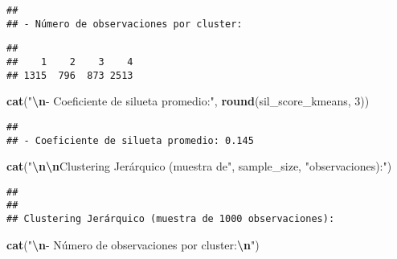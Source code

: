 \documentclass[
]{article}
\newenvironment{Shaded}{\begin{snugshade}}{\end{snugshade}}
\newcommand{\DecValTok}[1]{\textcolor[rgb]{0.00,0.00,0.81}{#1}}
\newcommand{\FunctionTok}[1]{\textcolor[rgb]{0.13,0.29,0.53}{\textbf{#1}}}
\newcommand{\NormalTok}[1]{#1}
\newcommand{\SpecialCharTok}[1]{\textcolor[rgb]{0.81,0.36,0.00}{\textbf{#1}}}
\newcommand{\StringTok}[1]{\textcolor[rgb]{0.31,0.60,0.02}{#1}}
\begin{document}
\begin{verbatim}
## 
## - Número de observaciones por cluster:
\end{verbatim}

\begin{Shaded}
\end{Shaded}

\begin{verbatim}
## 
##    1    2    3    4 
## 1315  796  873 2513
\end{verbatim}

\begin{Shaded}
\begin{Highlighting}[]
\FunctionTok{cat}\NormalTok{(}\StringTok{"}\SpecialCharTok{\textbackslash{}n}\StringTok{{-} Coeficiente de silueta promedio:"}\NormalTok{, }\FunctionTok{round}\NormalTok{(sil\_score\_kmeans, }\DecValTok{3}\NormalTok{))}
\end{Highlighting}
\end{Shaded}

\begin{verbatim}
## 
## - Coeficiente de silueta promedio: 0.145
\end{verbatim}

\begin{Shaded}
\begin{Highlighting}[]
\FunctionTok{cat}\NormalTok{(}\StringTok{"}\SpecialCharTok{\textbackslash{}n\textbackslash{}n}\StringTok{Clustering Jerárquico (muestra de"}\NormalTok{, sample\_size, }\StringTok{"observaciones):"}\NormalTok{)}
\end{Highlighting}
\end{Shaded}

\begin{verbatim}
## 
## 
## Clustering Jerárquico (muestra de 1000 observaciones):
\end{verbatim}

\begin{Shaded}
\begin{Highlighting}[]
\FunctionTok{cat}\NormalTok{(}\StringTok{"}\SpecialCharTok{\textbackslash{}n}\StringTok{{-} Número de observaciones por cluster:}\SpecialCharTok{\textbackslash{}n}\StringTok{"}\NormalTok{)}
\end{Highlighting}
\end{Shaded}
\end{document}
